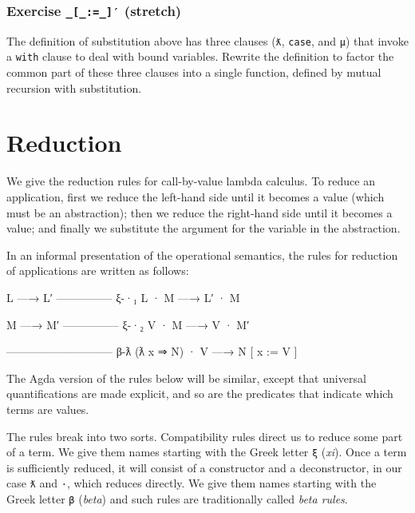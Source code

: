 \hypertarget{exercise-___-stretch}{%
\subsubsection{\texorpdfstring{Exercise \texttt{\_{[}\_:=\_{]}′}
(stretch)}{Exercise \_{[}\_:=\_{]}′ (stretch)}}\label{exercise-___-stretch}}

The definition of substitution above has three clauses (\texttt{ƛ},
\texttt{case}, and \texttt{μ}) that invoke a \texttt{with} clause to
deal with bound variables. Rewrite the definition to factor the common
part of these three clauses into a single function, defined by mutual
recursion with substitution.

\begin{fence}
\begin{code}%
\>[0]\<%
\end{code}
\end{fence}

\hypertarget{reduction}{%
\section{Reduction}\label{reduction}}

We give the reduction rules for call-by-value lambda calculus. To reduce
an application, first we reduce the left-hand side until it becomes a
value (which must be an abstraction); then we reduce the right-hand side
until it becomes a value; and finally we substitute the argument for the
variable in the abstraction.

In an informal presentation of the operational semantics, the rules for
reduction of applications are written as follows:

\begin{myDisplay}
L —→ L′
--------------- ξ-·₁
L · M —→ L′ · M

M —→ M′
--------------- ξ-·₂
V · M —→ V · M′

----------------------------- β-ƛ
(ƛ x ⇒ N) · V —→ N [ x := V ]
\end{myDisplay}

The Agda version of the rules below will be similar, except that
universal quantifications are made explicit, and so are the predicates
that indicate which terms are values.

The rules break into two sorts. Compatibility rules direct us to reduce
some part of a term. We give them names starting with the Greek letter
\texttt{ξ} (\emph{xi}). Once a term is sufficiently reduced, it will
consist of a constructor and a deconstructor, in our case \texttt{ƛ} and
\texttt{·}, which reduces directly. We give them names starting with the
Greek letter \texttt{β} (\emph{beta}) and such rules are traditionally
called \emph{beta rules}.

